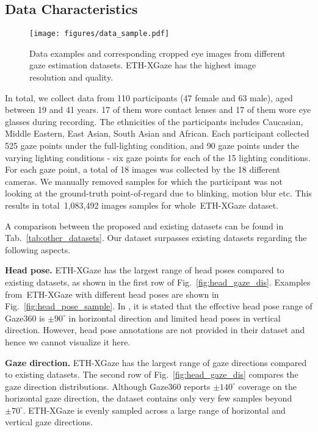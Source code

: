 \documentclass[runningheads]{llncs}
\newcommand{\datasetname}{ETH-XGaze\xspace}
\newcommand{\numsample}{1,083,492\xspace}
\begin{document}
\subsection{Data Characteristics}

\begin{figure}[t]
    \centering
    \texttt{[image: figures/data\_sample.pdf]}
    \caption{Data examples and corresponding cropped eye images from different gaze estimation datasets. \datasetname has the highest image resolution and quality.}
    \label{fig:data_sample}
\end{figure}

In total, we collect data from 110 participants (47 female and 63 male), aged between 19 and 41 years.
17 of them wore contact lenses and 17 of them wore eye glasses during recording.
The ethnicities of the participants includes Caucasian, Middle Eastern, East Asian, South Asian and African.
Each participant collected 525 gaze points under the full-lighting condition, and 90 gaze points under the varying lighting conditions - six gaze points for each of the 15 lighting conditions.
For each gaze point, a total of 18 images was collected by the 18 different cameras.
We manually removed samples for which the participant was not looking at the ground-truth point-of-regard due to  blinking, motion blur etc.
This results in total~\numsample images samples for whole~\datasetname dataset.

A comparison between the proposed and existing datasets can be found in Tab.~\ref{tab:other_datasets}.
Our dataset surpasses existing datasets regarding the following aspects.

\textbf{Head pose.} \datasetname has the largest range of head poses compared to existing datasets, as shown in the first row of Fig.~\ref{fig:head_gaze_dis}. Examples from~\datasetname with different head poses are shown in Fig.~\ref{fig:head_pose_sample}.
In \cite{kellnhofer2019gaze360}, it is stated that the effective head pose range of Gaze360 is $\pm90^{\circ}$ in horizontal direction and limited head poses in vertical direction. However, head pose annotations are not provided in their dataset and hence we cannot visualize it here.

\textbf{Gaze direction.} \datasetname has the largest range of gaze directions compared to existing datasets.
The second row of Fig.~\ref{fig:head_gaze_dis} compares the gaze direction distributions.
Although Gaze360 reports $\pm140^{\circ}$ coverage on the horizontal gaze direction, the dataset contains only very few samples beyond $\pm70^{\circ}$.
\datasetname is evenly sampled across a large range of horizontal and vertical gaze directions.
\end{document}
